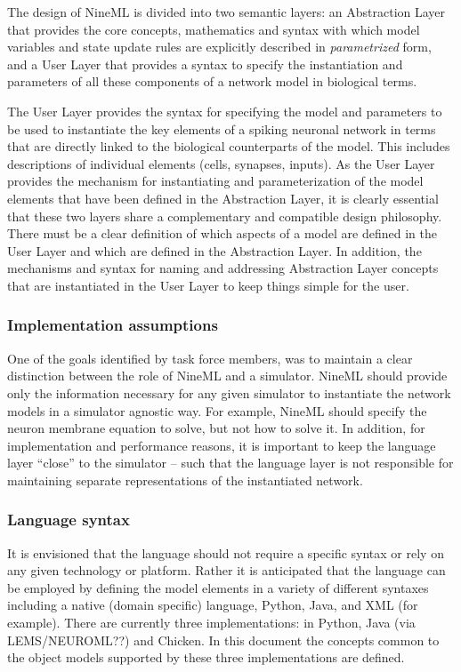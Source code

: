 \documentclass{article}
\begin{document}
The design of NineML is divided into two semantic layers: an Abstraction
Layer that provides the core concepts, mathematics and syntax with which
model variables and state update rules are explicitly described in
{\em parametrized} form, and a User Layer that provides a syntax to specify
the instantiation and parameters of all these components of a network model
in biological terms.

The User Layer provides the syntax for specifying the model and parameters to
be used to instantiate the key elements of a spiking neuronal network in terms
that are directly linked to the biological counterparts of the model. This
includes descriptions of individual elements (cells, synapses, inputs).
As the User Layer provides the mechanism for instantiating and
parameterization of the model elements that have been defined in the
Abstraction Layer, it is clearly essential that these two layers share
a complementary and compatible design philosophy. There must be a
clear definition of which aspects of a model are defined in the User
Layer and which are defined in the Abstraction Layer. In addition, the
mechanisms and syntax for naming and addressing Abstraction Layer
concepts that are instantiated in the User Layer to keep things simple
for the user.

\subsubsection{Implementation assumptions}

One of the goals identified by task force members, was to maintain a
clear distinction between the role of NineML and a simulator. NineML
should provide only the information necessary for any given simulator
to instantiate the network models in a simulator agnostic way.  For
example, NineML should specify the neuron membrane equation to solve,
but not how to solve it.  In addition, for implementation and
performance reasons, it is important to keep the language layer
``close'' to the simulator – such that the language layer is not
responsible for maintaining separate representations of the
instantiated network.

\subsubsection{Language syntax}

It is envisioned that the language should not require a
specific syntax or rely on any given technology or platform.
Rather it is anticipated that the language can be
employed by defining the model elements in a variety of different
syntaxes including a native (domain specific) language, Python, Java,
and XML (for example). There are currently three implementations:
in Python, Java (via LEMS/NEUROML??) and Chicken. In this document
the concepts common to the object models supported by these three
implementations are defined.
\end{document}
